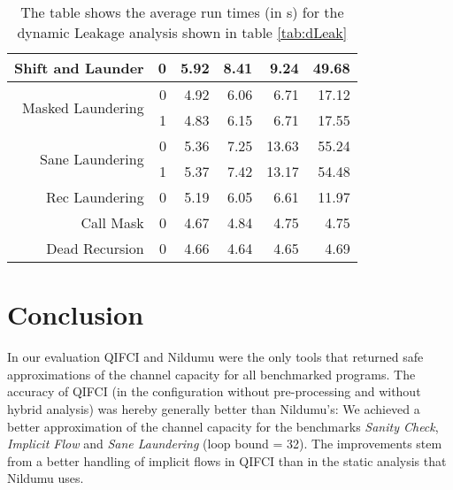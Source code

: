 \begin{table}[]
\begin{tabular}{rr|rr|rr}
Shift and Launder                  & 0       & 5.92             & 8.41            & 9.24              & 49.68             \\\hline
\multirow{2}{*}{Masked Laundering} & 0       & 4.92             & 6.06            & 6.71              & 17.12             \\
                                   & 1       & 4.83             & 6.15            & 6.71              & 17.55             \\\hline
\multirow{2}{*}{Sane Laundering}   & 0       & 5.36             & 7.25            & 13.63             & 55.24             \\
                                   & 1       & 5.37             & 7.42            & 13.17             & 54.48             \\\hline\hline
Rec Laundering                     & 0       & 5.19             & 6.05            & 6.61              & 11.97             \\\hline
Call Mask                          & 0       & 4.67             & 4.84            & 4.75              & 4.75              \\\hline
Dead Recursion                     & 0       & 4.66             & 4.64            & 4.65              & 4.69
\end{tabular}
\caption{The table shows the average run times (in s) for the dynamic Leakage analysis shown in table \ref{tab:dLeak}}\label{tab:dLeakTime}
\end{table}

\section{Conclusion}
In our evaluation QIFCI and Nildumu were the only tools that returned safe approximations of the channel capacity for all benchmarked programs.
The accuracy of QIFCI (in the configuration without pre-processing and without hybrid analysis) was hereby generally better than Nildumu's: We achieved a better approximation of the channel capacity for the benchmarks \emph{Sanity Check}, \emph{Implicit Flow} and \emph{Sane Laundering} (loop bound = 32). The improvements stem from a better handling of implicit flows in QIFCI than in the static analysis that Nildumu uses.